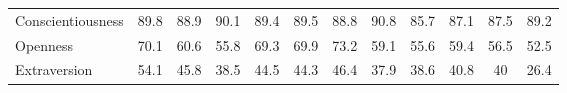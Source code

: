 \begin{table}[t]
\begin{tabular}{l|ccccc|ccccc|c}
Conscientiousness & \cellcolor{royalblue!15} 89.8 & \cellcolor{myred!8} 88.9 & \cellcolor{royalblue!23} 90.1 & \cellcolor{royalblue!5} 89.4 & \cellcolor{royalblue!8} 89.5 & \cellcolor{myred!10} 88.8 & \cellcolor{royalblue!41} 90.8 & \cellcolor{myred!90} 85.7 & \cellcolor{myred!54} 87.1 & \cellcolor{myred!44} 87.5 & 89.2 \\
Openness & \cellcolor{royalblue!77} 70.1 & \cellcolor{royalblue!35} 60.6 & \cellcolor{royalblue!14} 55.8 & \cellcolor{royalblue!73} 69.3 & \cellcolor{royalblue!76} 69.9 & \cellcolor{royalblue!90} 73.2 & \cellcolor{royalblue!29} 59.1 & \cellcolor{royalblue!13} 55.6 & \cellcolor{royalblue!30} 59.4 & \cellcolor{royalblue!17} 56.5 & 52.5 \\
Extraversion & \cellcolor{royalblue!90} 54.1 & \cellcolor{royalblue!63} 45.8 & \cellcolor{royalblue!39} 38.5 & \cellcolor{royalblue!59} 44.5 & \cellcolor{royalblue!58} 44.3 & \cellcolor{royalblue!65} 46.4 & \cellcolor{royalblue!37} 37.9 & \cellcolor{royalblue!40} 38.6 & \cellcolor{royalblue!47} 40.8 & \cellcolor{royalblue!44} 40 & 26.4 \\
\bottomrule
\end{tabular}
\vspace{-0.15in}
\end{table}